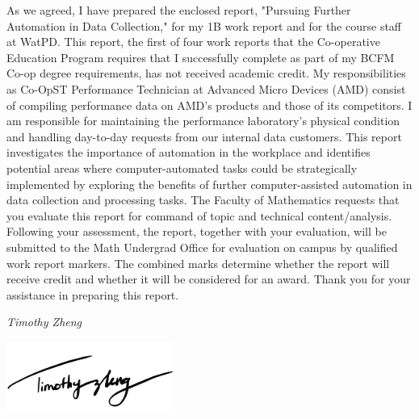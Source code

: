 \documentclass[12pt]{article}
\newcommand{\term}{1B } %
\newcommand{\WTT}{Pursuing Further Automation in Data Collection}
\begin{document}




\FirstPage

\newpage




\LetterHead



As we agreed, I have prepared the enclosed report, "\WTT," for
my \term work report and for the course staff at WatPD. This
report, the first of four work reports that the Co-operative Education Program
requires that I successfully complete as part of my BCFM Co-op degree
requirements, has not received academic credit.
\vskip 10pt
My responsibilities as Co-OpST Performance Technician at Advanced Micro Devices (AMD) consist of compiling performance data on AMD's products and those of its competitors. I am responsible for maintaining the performance laboratory's physical condition and handling day-to-day requests from our internal data customers. This report investigates the importance of automation in the workplace and identifies potential areas where computer-automated tasks could be strategically implemented by exploring the benefits of further computer-assisted automation in data collection and processing tasks. 
\vskip 10pt 
The Faculty of Mathematics requests that you evaluate this report for command
of topic and technical content/analysis. Following your assessment, the report,
together with your evaluation, will be submitted to the Math Undergrad Office
for evaluation on campus by qualified work report markers. The combined
marks determine whether the report will receive credit and whether it will be
considered for an award.
\vskip 10pt 
Thank you for your assistance in preparing this report.

\emph{Timothy Zheng}

\includegraphics[height=2.339cm]{signature.png}
\end{document}

